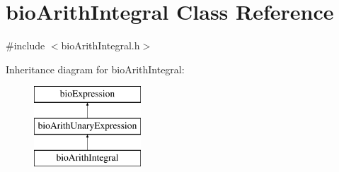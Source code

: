 \hypertarget{classbio_arith_integral}{}\section{bio\+Arith\+Integral Class Reference}
\label{classbio_arith_integral}


{\ttfamily \#include $<$bio\+Arith\+Integral.\+h$>$}

Inheritance diagram for bio\+Arith\+Integral\+:\begin{figure}[H]
\begin{center}
\leavevmode
\includegraphics[height=3.000000cm]{classbio_arith_integral}
\end{center}
\end{figure}
